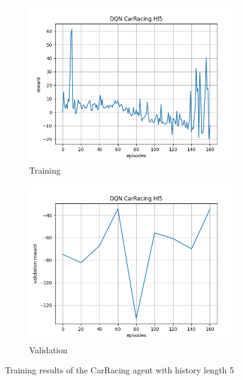 \documentclass[10pt]{scrartcl}
\begin{document}
\begin{figure}[h]
    \begin{subfigure}{0.5\textwidth}
      \centering
      \includegraphics[width=\linewidth]{images/RL_hl5.png}
      \caption{Training}
      \label{fig:RL_hl5_train}
    \end{subfigure} 
    \begin{subfigure}{0.5\textwidth}
      \centering
      \includegraphics[width=\linewidth]{images/RL_hl5_val.png}
      \caption{Validation}
      \label{fig:RL_hl5_val}
    \end{subfigure}
    \caption{Training results of the CarRacing agent with history length 5}
    \label{fig:Rl_hl3}
\end{figure}
\end{document}
